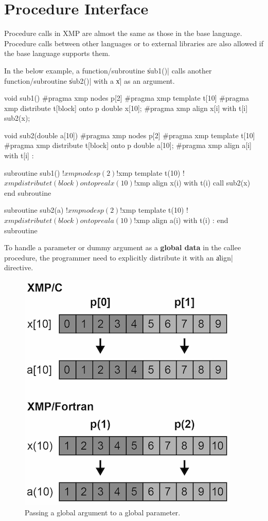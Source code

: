 \section{Procedure Interface}

Procedure calls in XMP are almost the same as those in the base language.
%
Procedure calls between other languages or to external libraries
are also allowed if the base language supports them. 

In the below example, a function/subroutine \|sub1()| calls another
function/subroutine \|sub2()| with a {\darray} \|x| as an
argument.

\begin{XCexample}
void sub1(){
#pragma xmp nodes p[2]
#pragma xmp template t[10]
#pragma xmp distribute t[block] onto p
  double x[10];
#pragma xmp align x[i] with t[i]
  sub2(x);
}

void sub2(double a[10]){
#pragma xmp nodes p[2]
#pragma xmp template t[10]
#pragma xmp distribute t[block] onto p
  double a[10];
#pragma xmp align a[i] with t[i]
  :
}
\end{XCexample}

\begin{XFexample}
subroutine sub1()
!$xmp nodes p(2)
!$xmp template t(10)
!$xmp distribute t(block) onto p
  real x(10)
!$xmp align x(i) with t(i)
  call sub2(x)
end subroutine

subroutine sub2(a)
!$xmp nodes p(2)
!$xmp template t(10)
!$xmp distribute t(block) onto p
  real a(10)
!$xmp align a(i) with t(i)
  :
end subroutine
\end{XFexample}


To handle a parameter or dummy argument as a {\bf global data} in the
callee procedure, the programmer need to explicitly distribute it with
an \|align| directive.

\begin{figure}
  \centering
  \includegraphics[width=0.7\columnwidth]{figs/destributed_array.png}
  \caption{Passing a global argument to a global parameter.}
\end{figure}

